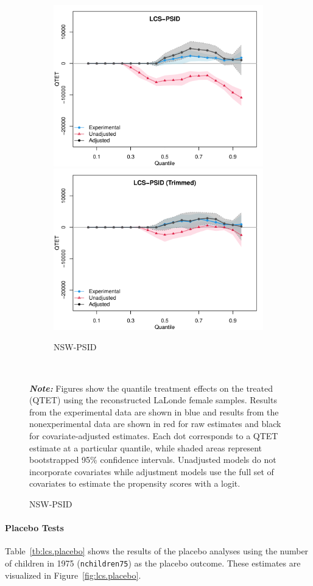 \documentclass[letterpaper,12pt,leqno]{article}
\begin{document}
\begin{figure}[!ht]
    \caption{Quantile Treatment Effects: Reconstructed Female Samples}\label{fig:lcs.qte}
    \begin{minipage}[c]{1\textwidth}
        \centering\vspace{-1em}
        \begin{subfigure}{1\linewidth}\hspace{1em}\centering
            \includegraphics[width=0.45\linewidth]{qte_lcs_psid.pdf}\hspace{2em}
            \includegraphics[width=0.45\linewidth]{qte_lcs_psid_trim.pdf}
            \caption{NSW-PSID}
        \end{subfigure}
    \end{minipage}%
    \\\raggedright
     {\footnotesize\textbf{\textit{Note:}} Figures show the quantile treatment effects on the treated (QTET) using the reconstructed LaLonde female samples. Results from the experimental data are shown in blue and results from the  nonexperimental data are shown in red for raw estimates and black for covariate-adjusted estimates. Each dot corresponds to a QTET estimate at a particular quantile, while shaded areas represent bootstrapped 95\% confidence intervals. Unadjusted models do not incorporate covariates while adjustment models use the full set of covariates to estimate the propensity scores with a logit.}
\end{figure}
\clearpage


\paragraph{Placebo Tests} Table~\ref{tb:lcs.placebo} shows the results of the placebo analyses using the number of children in 1975 (\texttt{nchildren75}) as the placebo outcome. These estimates are visualized in Figure~\ref{fig:lcs.placebo}.
\end{document}
